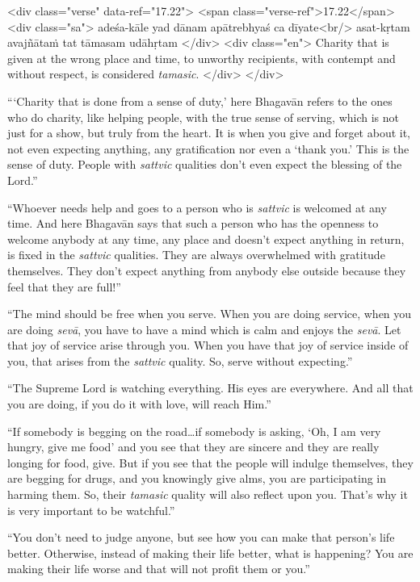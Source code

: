 \begin{html}
<div class="verse" data-ref="17.22">
  <span class="verse-ref">17.22</span>
  <div class="sa">
    adeśa-kāle yad dānam apātrebhyaś ca dīyate<br/>
    asat-kṛtam avajñātaṁ tat tāmasam udāhṛtam
  </div>
  <div class="en">
    Charity that is given at the wrong place and time, to unworthy recipients, with contempt and without respect, is considered \textit{tamasic}.
  </div>
</div>
\end{html}


\enquote{\enquote{Charity that is done from a sense of duty,} here Bhagavān refers to the ones who do charity, like helping people, with the true sense of serving, which is not just for a show, but truly from the heart. It is when you give and forget about it, not even expecting anything, any gratification nor even a \enquote{thank you.} This is the sense of duty. People with \textit{sattvic} qualities don’t even expect the blessing of the Lord.}

\enquote{Whoever needs help and goes to a person who is \textit{sattvic} is welcomed at any time. And here Bhagavān says that such a person who has the openness to welcome anybody at any time, any place and doesn’t expect anything in return, is fixed in the \textit{sattvic} qualities. They are always overwhelmed with gratitude themselves. They don’t expect anything from anybody else outside because they feel that they are full!}

\enquote{The mind should be free when you serve. When you are doing service, when you are doing \textit{sevā}, you have to have a mind which is calm and enjoys the \textit{sevā}. Let that joy of service arise through you. When you have that joy of service inside of you, that arises from the \textit{sattvic} quality. So, serve without expecting.}

\enquote{The Supreme Lord is watching everything. His eyes are everywhere. And all that you are doing, if you do it with love, will reach Him.}

\enquote{If somebody is begging on the road\ldots if somebody is asking, \enquote{Oh, I am very hungry, give me food} and you see that they are sincere and they are really longing for food, give. But if you see that the people will indulge themselves, they are begging for drugs, and you knowingly give alms, you are participating in harming them. So, their \textit{tamasic} quality will also reflect upon you. That’s why it is very important to be watchful.}

\enquote{You don’t need to judge anyone, but see how you can make that person’s life better. Otherwise, instead of making their life better, what is happening? You are making their life worse and that will not profit them or you.}

